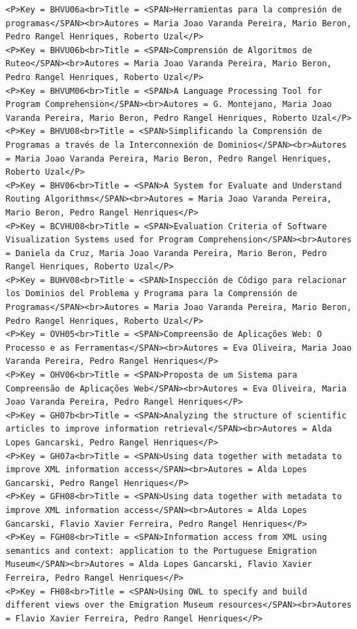 \documentclass[11pt,a4paper]{report}
\begin{document}
\begin{appendices}
\begin{lstlisting}
<P>Key = BHVU06a<br>Title = <SPAN>Herramientas para la compresión de programas</SPAN><br>Autores = Maria Joao Varanda Pereira, Mario Beron, Pedro Rangel Henriques, Roberto Uzal</P>
<P>Key = BHVU06b<br>Title = <SPAN>Comprensión de Algoritmos de Ruteo</SPAN><br>Autores = Maria Joao Varanda Pereira, Mario Beron, Pedro Rangel Henriques, Roberto Uzal</P>
<P>Key = BHVUM06<br>Title = <SPAN>A Language Processing Tool for Program Comprehension</SPAN><br>Autores = G. Montejano, Maria Joao Varanda Pereira, Mario Beron, Pedro Rangel Henriques, Roberto Uzal</P>
<P>Key = BHVU08<br>Title = <SPAN>Simplificando la Comprensión de Programas a través de la Interconnexión de Dominios</SPAN><br>Autores = Maria Joao Varanda Pereira, Mario Beron, Pedro Rangel Henriques, Roberto Uzal</P>
<P>Key = BHV06<br>Title = <SPAN>A System for Evaluate and Understand Routing Algorithms</SPAN><br>Autores = Maria Joao Varanda Pereira, Mario Beron, Pedro Rangel Henriques</P>
<P>Key = BCVHU08<br>Title = <SPAN>Evaluation Criteria of Software Visualization Systems used for Program Comprehension</SPAN><br>Autores = Daniela da Cruz, Maria Joao Varanda Pereira, Mario Beron, Pedro Rangel Henriques, Roberto Uzal</P>
<P>Key = BUHV08<br>Title = <SPAN>Inspección de Código para relacionar los Dominios del Problema y Programa para la Comprensión de Programas</SPAN><br>Autores = Maria Joao Varanda Pereira, Mario Beron, Pedro Rangel Henriques, Roberto Uzal</P>
<P>Key = OVH05<br>Title = <SPAN>Compreensão de Aplicações Web: O Processo e as Ferramentas</SPAN><br>Autores = Eva Oliveira, Maria Joao Varanda Pereira, Pedro Rangel Henriques</P>
<P>Key = OHV06<br>Title = <SPAN>Proposta de um Sistema para Compreensão de Aplicações Web</SPAN><br>Autores = Eva Oliveira, Maria Joao Varanda Pereira, Pedro Rangel Henriques</P>
<P>Key = GH07b<br>Title = <SPAN>Analyzing the structure of scientific articles to improve information retrieval</SPAN><br>Autores = Alda Lopes Gancarski, Pedro Rangel Henriques</P>
<P>Key = GH07a<br>Title = <SPAN>Using data together with metadata to improve XML information access</SPAN><br>Autores = Alda Lopes Gancarski, Pedro Rangel Henriques</P>
<P>Key = GFH08<br>Title = <SPAN>Using data together with metadata to improve XML information access</SPAN><br>Autores = Alda Lopes Gancarski, Flavio Xavier Ferreira, Pedro Rangel Henriques</P>
<P>Key = FGH08<br>Title = <SPAN>Information access from XML using semantics and context: application to the Portuguese Emigration Museum</SPAN><br>Autores = Alda Lopes Gancarski, Flavio Xavier Ferreira, Pedro Rangel Henriques</P>
<P>Key = FH08<br>Title = <SPAN>Using OWL to specify and build different views over the Emigration Museum resources</SPAN><br>Autores = Flavio Xavier Ferreira, Pedro Rangel Henriques</P>

\end{lstlisting}
\end{appendices}
\end{document}
